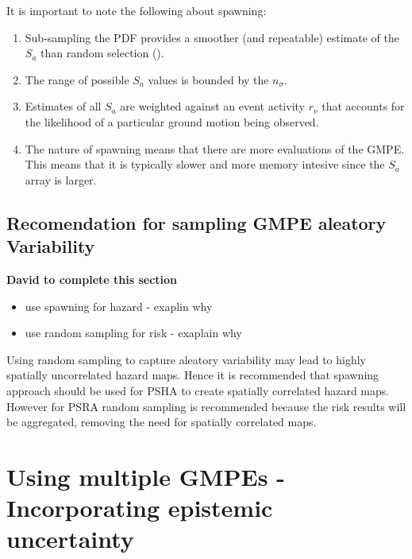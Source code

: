 It is important to note the following about spawning:
\begin{enumerate}
\item Sub-sampling the PDF provides a smoother (and repeatable)
estimate of the $S_a$ than random selection
(). \item The range of possible $S_a$
values is bounded by the $n_\sigma$. \item Estimates of all $S_a$
are weighted against an event activity $r_\nu$ that accounts for the
likelihood of a particular ground motion being observed. \item The
nature of spawning means that there are more evaluations of the
GMPE. This means that it is typically slower and more memory
intesive since the $S_a$ array is larger.
\end{enumerate}




\subsection{Recomendation for sampling GMPE aleatory Variability}

\textbf{David to complete this section}
\begin{itemize}
\item use spawning for hazard - exaplin why
\item use random sampling for risk - exaplain why
\end{itemize}
Using random sampling to capture aleatory variability may lead to
highly spatially uncorrelated hazard maps. Hence it is recommended
that spawning approach should be used for PSHA to create spatially
correlated hazard maps. However for PSRA random sampling is
recommended because the risk results will be aggregated, removing
the need for spatially correlated maps.
\section{Using multiple GMPEs - Incorporating epistemic uncertainty}
\label{sec:attn-multi-attnmodels}

